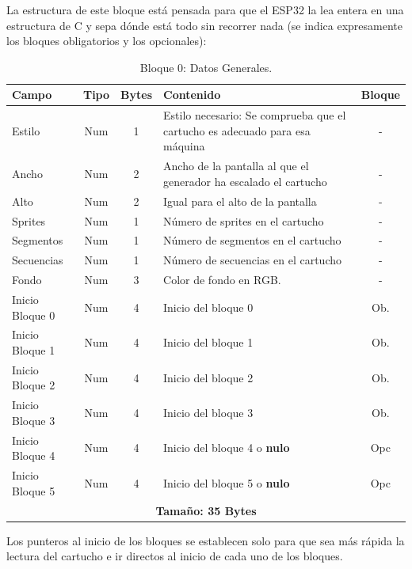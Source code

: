 La estructura de este bloque está pensada para que el ESP32 la lea entera en una
estructura de C y sepa dónde está todo sin recorrer nada (se indica expresamente los bloques obligatorios y los opcionales):

\begin{table}[H]
	\centering
	\begin{tabular}{|l|c|c|p{7.4cm}|c|}
		\hline
		\textbf{Campo} & \textbf{Tipo} & \textbf{Bytes} & \textbf{Contenido} & \textbf{Bloque} \\
		\hline
		
		Estilo & Num & 1 & Estilo necesario: Se comprueba que el cartucho es adecuado para esa máquina & -  \\ \hline
		Ancho & Num & 2 & Ancho de la pantalla al que el generador ha escalado el cartucho & -  \\ \hline
		Alto & Num & 2 & Igual para el alto de la pantalla & -  \\ \hline
		Sprites & Num & 1 & Número de sprites en el cartucho & -  \\ \hline
		Segmentos & Num & 1 & Número de segmentos en el cartucho & -  \\ \hline
		Secuencias & Num & 1 & Número de secuencias en el cartucho & - \\ \hline
		Fondo & Num & 3 & Color de fondo en RGB. & - \\ \hline
		Inicio Bloque 0 & Num & 4 & Inicio del bloque 0 & Ob. \\ \hline
		Inicio Bloque 1 & Num & 4 & Inicio del bloque 1 & Ob. \\ \hline
		Inicio Bloque 2 & Num & 4 & Inicio del bloque 2 & Ob. \\ \hline
		Inicio Bloque 3 & Num & 4 & Inicio del bloque 3 & Ob. \\ \hline
		Inicio Bloque 4 & Num & 4 & Inicio del bloque 4 o \textbf{nulo} & Opc \\ \hline
		Inicio Bloque 5 & Num & 4 & Inicio del bloque 5 o \textbf{nulo} & Opc \\
		
		\hline\hline
		\multicolumn{5}{c}{\textbf{Tamaño: 35 Bytes}} \\ \hline
	\end{tabular}
	\caption{Bloque 0: Datos Generales.}
	\label{tab:bloque0DatosGenerales}
\end{table}

Los punteros al inicio de los bloques se establecen solo para que sea
más rápida la lectura del cartucho e ir directos al inicio de cada uno de los bloques.

